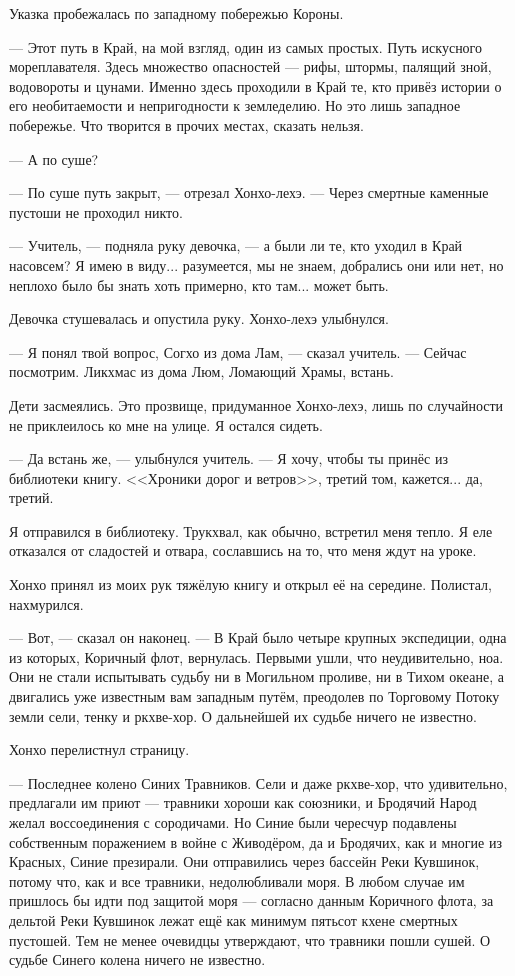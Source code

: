 Указка пробежалась по западному побережью Короны.

--- Этот путь в Край, на мой взгляд, один из самых простых.
Путь искусного мореплавателя.
Здесь множество опасностей --- рифы, штормы, палящий зной, водовороты и цунами.
Именно здесь проходили в Край те, кто привёз истории о его необитаемости и непригодности к земледелию.
Но это лишь западное побережье.
Что творится в прочих местах, сказать нельзя.

--- А по суше?

--- По суше путь закрыт, --- отрезал Хонхо-лехэ.
--- Через смертные каменные пустоши не проходил никто.

--- Учитель, --- подняла руку девочка, --- а были ли те, кто уходил в Край насовсем?
Я имею в виду... разумеется, мы не знаем, добрались они или нет, но неплохо было бы знать хоть примерно, кто там... может быть.

Девочка стушевалась и опустила руку.
Хонхо-лехэ улыбнулся.

--- Я понял твой вопрос, Согхо из дома Лам, --- сказал учитель.
--- Сейчас посмотрим.
Ликхмас из дома Люм, Ломающий Храмы, встань.

Дети засмеялись.
Это прозвище, придуманное Хонхо-лехэ, лишь по случайности не приклеилось ко мне на улице.
Я остался сидеть.

--- Да встань же, --- улыбнулся учитель.
--- Я хочу, чтобы ты принёс из библиотеки книгу.
<<Хроники дорог и ветров>>, третий том, кажется... да, третий.

Я отправился в библиотеку.
Трукхвал, как обычно, встретил меня тепло.
Я еле отказался от сладостей и отвара, сославшись на то, что меня ждут на уроке.

Хонхо принял из моих рук тяжёлую книгу и открыл её на середине.
Полистал, нахмурился.

--- Вот, --- сказал он наконец.
--- В Край было четыре крупных экспедиции, одна из которых, Коричный флот, вернулась.
Первыми ушли, что неудивительно, ноа.
Они не стали испытывать судьбу ни в Могильном проливе, ни в Тихом океане, а двигались уже известным вам западным путём, преодолев по Торговому Потоку земли сели, тенку и ркхве-хор.
О дальнейшей их судьбе ничего не известно.

Хонхо перелистнул страницу.

--- Последнее колено Синих Травников.
Сели и даже ркхве-хор, что удивительно, предлагали им приют --- травники хороши как союзники, и Бродячий Народ желал воссоединения с сородичами.
Но Синие были чересчур подавлены собственным поражением в войне с Живодёром, да и Бродячих, как и многие из Красных, Синие презирали.
Они отправились через бассейн Реки Кувшинок, потому что, как и все травники, недолюбливали моря.
В любом случае им пришлось бы идти под защитой моря --- согласно данным Коричного флота, за дельтой Реки Кувшинок лежат ещё как минимум пятьсот кхене смертных пустошей.
Тем не менее очевидцы утверждают, что травники пошли сушей.
О судьбе Синего колена ничего не известно.

